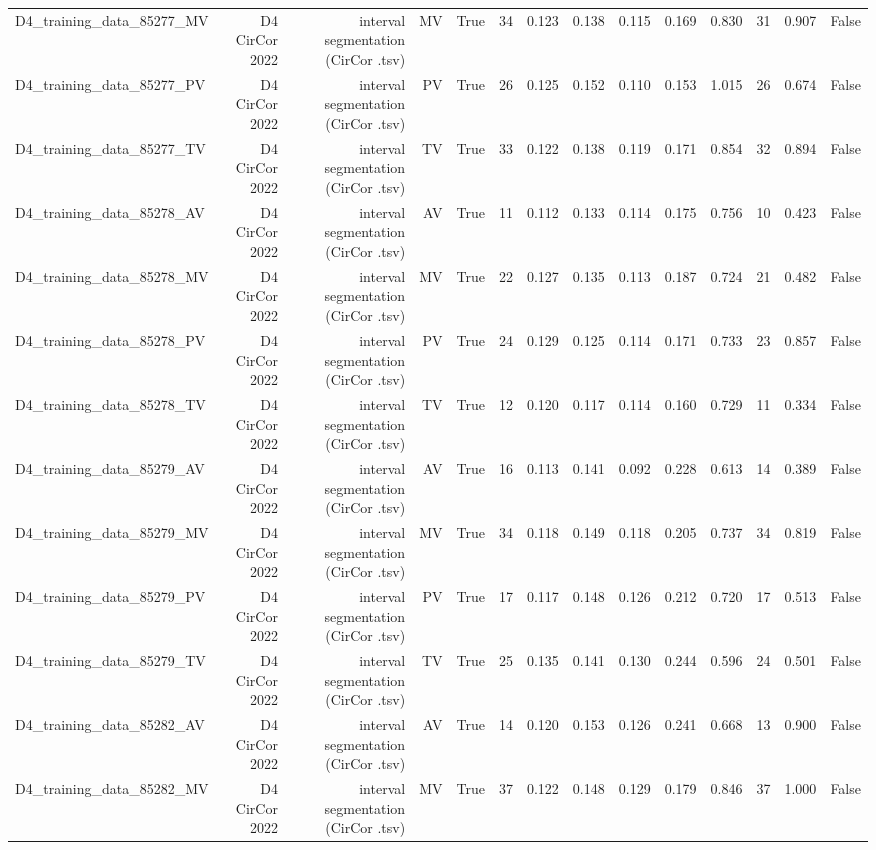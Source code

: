 \begin{table}[htbp]
\begin{tabular}{lrrrrrrrrrrrrr}
    D4\_training\_data\_85277\_MV & D4 CirCor 2022 & interval segmentation (CirCor .tsv) & MV & True & 34 & 0.123 & 0.138 & 0.115 & 0.169 & 0.830 & 31 & 0.907 & False \\
    D4\_training\_data\_85277\_PV & D4 CirCor 2022 & interval segmentation (CirCor .tsv) & PV & True & 26 & 0.125 & 0.152 & 0.110 & 0.153 & 1.015 & 26 & 0.674 & False \\
    D4\_training\_data\_85277\_TV & D4 CirCor 2022 & interval segmentation (CirCor .tsv) & TV & True & 33 & 0.122 & 0.138 & 0.119 & 0.171 & 0.854 & 32 & 0.894 & False \\
    D4\_training\_data\_85278\_AV & D4 CirCor 2022 & interval segmentation (CirCor .tsv) & AV & True & 11 & 0.112 & 0.133 & 0.114 & 0.175 & 0.756 & 10 & 0.423 & False \\
    D4\_training\_data\_85278\_MV & D4 CirCor 2022 & interval segmentation (CirCor .tsv) & MV & True & 22 & 0.127 & 0.135 & 0.113 & 0.187 & 0.724 & 21 & 0.482 & False \\
    D4\_training\_data\_85278\_PV & D4 CirCor 2022 & interval segmentation (CirCor .tsv) & PV & True & 24 & 0.129 & 0.125 & 0.114 & 0.171 & 0.733 & 23 & 0.857 & False \\
    D4\_training\_data\_85278\_TV & D4 CirCor 2022 & interval segmentation (CirCor .tsv) & TV & True & 12 & 0.120 & 0.117 & 0.114 & 0.160 & 0.729 & 11 & 0.334 & False \\
    D4\_training\_data\_85279\_AV & D4 CirCor 2022 & interval segmentation (CirCor .tsv) & AV & True & 16 & 0.113 & 0.141 & 0.092 & 0.228 & 0.613 & 14 & 0.389 & False \\
    D4\_training\_data\_85279\_MV & D4 CirCor 2022 & interval segmentation (CirCor .tsv) & MV & True & 34 & 0.118 & 0.149 & 0.118 & 0.205 & 0.737 & 34 & 0.819 & False \\
    D4\_training\_data\_85279\_PV & D4 CirCor 2022 & interval segmentation (CirCor .tsv) & PV & True & 17 & 0.117 & 0.148 & 0.126 & 0.212 & 0.720 & 17 & 0.513 & False \\
    D4\_training\_data\_85279\_TV & D4 CirCor 2022 & interval segmentation (CirCor .tsv) & TV & True & 25 & 0.135 & 0.141 & 0.130 & 0.244 & 0.596 & 24 & 0.501 & False \\
    D4\_training\_data\_85282\_AV & D4 CirCor 2022 & interval segmentation (CirCor .tsv) & AV & True & 14 & 0.120 & 0.153 & 0.126 & 0.241 & 0.668 & 13 & 0.900 & False \\
    D4\_training\_data\_85282\_MV & D4 CirCor 2022 & interval segmentation (CirCor .tsv) & MV & True & 37 & 0.122 & 0.148 & 0.129 & 0.179 & 0.846 & 37 & 1.000 & False \\

\end{tabular}
\end{table}
